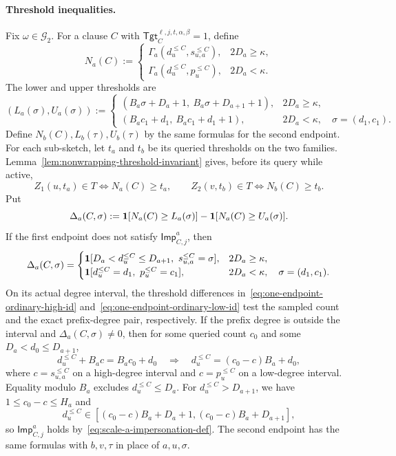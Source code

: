 \paragraph{Threshold inequalities.}
Fix $\omega\in\mathcal G_2$.
For a clause $C$ with $\mathsf{Tgt}^{\ell,j,t,\alpha,\beta}_C=1$, define
\[
  N_a(C):=\begin{cases}
    \Gamma_a(d_u^{\le C},s_{u,a}^{\le C}),&2D_a\ge\kappa,\\
    \Gamma_a(d_u^{\le C},p_u^{\le C}),&2D_a<\kappa.
  \end{cases}
\]
The lower and upper thresholds are
\[
  (L_a(\sigma),U_a(\sigma)):=\begin{cases}
    (B_a\sigma+D_a+1,\ B_a\sigma+D_{a+1}+1),&2D_a\ge\kappa,\\
    (B_a c_1+d_1,\ B_a c_1+d_1+1),&2D_a<\kappa,\quad\sigma=(d_1,c_1).
  \end{cases}
\]
Define $N_b(C),L_b(\tau),U_b(\tau)$ by the same formulas for the second endpoint.
For each sub-sketch, let $t_a$ and $t_b$ be its queried thresholds on the two families.
Lemma~\ref{lem:nonwrapping-threshold-invariant} gives, before its query while active,
\[
  Z_1(u,t_a)\in T\iff N_a(C)\ge t_a,\qquad
  Z_2(v,t_b)\in T\iff N_b(C)\ge t_b.
\]
Put
\[
  \Delta_a(C,\sigma):=\mathbf 1[N_a(C)\ge L_a(\sigma)]-\mathbf 1[N_a(C)\ge U_a(\sigma)].
\]
If the first endpoint does not satisfy $\mathsf{Imp}^{a}_{C,j}$, then
\[
  \Delta_a(C,\sigma)=\begin{cases}
    \mathbf 1[D_a<d_u^{\le C}\le D_{a+1},\ s_{u,a}^{\le C}=\sigma],&2D_a\ge\kappa,\\
    \mathbf 1[d_u^{\le C}=d_1,\ p_u^{\le C}=c_1],&2D_a<\kappa,\quad\sigma=(d_1,c_1).
  \end{cases}
\]
On its actual degree interval, the threshold differences in~\eqref{eq:one-endpoint-ordinary-high-id} and~\eqref{eq:one-endpoint-ordinary-low-id} test the sampled count and the exact prefix-degree pair, respectively.
If the prefix degree is outside the interval and $\Delta_a(C,\sigma)\ne0$, then for some queried count $c_0$ and some $D_a<d_0\le D_{a+1}$,
\[
  d_u^{\le C}+B_a c=B_a c_0+d_0
  \quad\Longrightarrow\quad
  d_u^{\le C}=(c_0-c)B_a+d_0,
\]
where $c=s_{u,a}^{\le C}$ on a high-degree interval and $c=p_u^{\le C}$ on a low-degree interval.
Equality modulo $B_a$ excludes $d_u^{\le C}\le D_a$.
For $d_u^{\le C}>D_{a+1}$, we have $1\le c_0-c\le H_a$ and
\[
d_u^{\le C}\in[(c_0-c)B_a+D_a+1,(c_0-c)B_a+D_{a+1}],
\]
so $\mathsf{Imp}^{a}_{C,j}$ holds by~\eqref{eq:scale-a-impersonation-def}.
The second endpoint has the same formulas with $b,v,\tau$ in place of $a,u,\sigma$.

